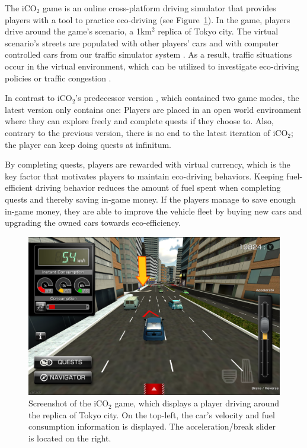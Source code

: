 \documentclass[preprint,authoryear,12pt]{elsarticle}
\begin{document}
The iCO$_2$ game is an online cross-platform driving simulator that provides players with a tool to practice eco-driving (see Figure~\ref{fig:iCO2_driving}). In the game, players drive around the game's scenario, a 1km$^2$ replica of Tokyo city. The virtual scenario's streets are populated with other players' cars and with computer controlled cars from our traffic simulator system \citep{Prendinger+others.2014}. As a result, traffic situations occur in the virtual environment, which can be utilized to investigate eco-driving policies \citep{Prendinger+others.2013} or traffic congestion \citep{Gajananan+others.2013}.

In contrast to iCO$_2$'s predecessor version \citep{prendingeroliveira2014}, which contained two game modes, the latest version only contains one: Players are placed in an open world environment where they can explore freely and complete quests if they choose to. Also, contrary to the previous version, there is no end to the latest iteration of iCO$_2$; the player can keep doing quests at infinitum.

By completing quests, players are rewarded with virtual currency, which is the key factor that motivates players to maintain eco-driving behaviors. Keeping fuel-efficient driving behavior reduces the amount of fuel spent when completing quests and thereby saving in-game money. If the players manage to save enough in-game money, they are able to improve the vehicle fleet by buying new cars and upgrading the owned cars towards eco-efficiency.

\begin{figure}[htb]
\begin{center}
\includegraphics[width=.95\linewidth]{ijhcs14-img/iCO2_driving}
\caption{Screenshot of the iCO$_2$ game, which displays a player driving around the replica of Tokyo city. On the top-left, the car's velocity and fuel consumption information is displayed. The acceleration/break slider is located on the right.\label{fig:iCO2_driving}}
\end{center}
\end{figure}
\end{document}
